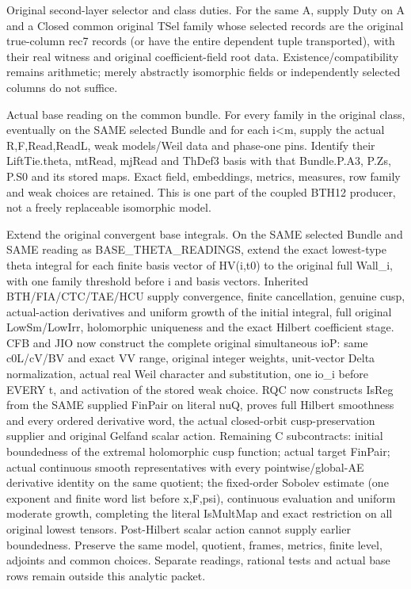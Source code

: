 \begin{description}[style=nextline]
\item[30. SECOND\_LAYER\_COMPATIBLE\_SELECTION --- C] Original second-layer selector and class duties. For the same A, supply Duty on A and a Closed common original TSel family whose selected records are the original true-column rec7 records (or have the entire dependent tuple transported), with their real witness and original coefficient-field root data. Existence/compatibility remains arithmetic; merely abstractly isomorphic fields or independently selected columns do not suffice.

\item[31. BASE\_THETA\_READINGS --- C] Actual base reading on the common bundle. For every family in the original class, eventually on the SAME selected Bundle and for each i<m, supply the actual R,F,Read,ReadL, weak models/Weil data and phase-one pins. Identify their LiftTie.theta, mtRead, mjRead and ThDef3 basis with that Bundle.P.A3, P.Zs, P.S0 and its stored maps. Exact field, embeddings, metrics, measures, row family and weak choices are retained. This is one part of the coupled BTH12 producer, not a freely replaceable isomorphic model.

\item[32. BASE\_THETA\_CUSPIDAL\_EXTENSION --- C] Extend the original convergent base integrals. On the SAME selected Bundle and SAME reading as BASE\_THETA\_READINGS, extend the exact lowest-type theta integral for each finite basis vector of HV(i,t0) to the original full Wall\_i, with one family threshold before i and basis vectors. Inherited BTH/FIA/CTC/TAE/HCU supply convergence, finite cancellation, genuine cusp, actual-action derivatives and uniform growth of the initial integral, full original LowSm/LowIrr, holomorphic uniqueness and the exact Hilbert coefficient stage. CFB and JIO now construct the complete original simultaneous ioP: same c0L/cV/BV and exact VV range, original integer weights, unit-vector Delta normalization, actual real Weil character and substitution, one io\_i before EVERY t, and activation of the stored weak choice. RQC now constructs IsReg from the SAME supplied FinPair on literal nuQ, proves full Hilbert smoothness and every ordered derivative word, the actual closed-orbit cusp-preservation supplier and original Gelfand scalar action. Remaining C subcontracts: initial boundedness of the extremal holomorphic cusp function; actual target FinPair; actual continuous smooth representatives with every pointwise/global-AE derivative identity on the same quotient; the fixed-order Sobolev estimate (one exponent and finite word list before x,F,psi), continuous evaluation and uniform moderate growth, completing the literal IsMultMap and exact restriction on all original lowest tensors. Post-Hilbert scalar action cannot supply earlier boundedness. Preserve the same model, quotient, frames, metrics, finite level, adjoints and common choices. Separate readings, rational tests and actual base rows remain outside this analytic packet.


\end{description}
